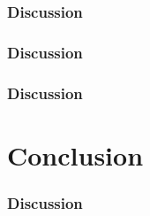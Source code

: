 \documentclass[9pt]{beamer}
\begin{document}
\begin{frame}
	\frametitle{Discussion}

\end{frame}

\begin{frame}
	\frametitle{Discussion}

\end{frame}

\begin{frame}
	\frametitle{Discussion}

\end{frame}

\section{Conclusion}
\begin{frame}
	\frametitle{Discussion}

\end{frame}
\end{document}
